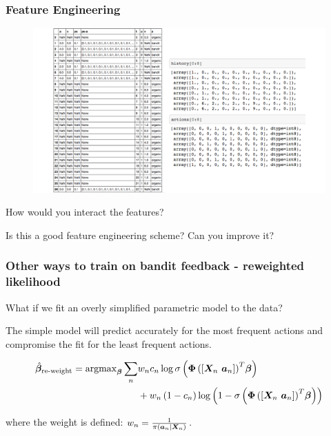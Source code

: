\begin{frame}
  \frametitle{Feature Engineering}
\begin{figure}[h!]
\includegraphics[scale=0.3]{images/feature_engineering.png}
\centering
\end{figure}

\pause
How would you interact the features?

\pause
Is this a good feature engineering scheme?  Can you improve it?
\end{frame}


\begin{frame}
  \frametitle{Other ways to train on bandit feedback - reweighted likelihood}

  What if we fit an overly simplified parametric model to the data?
  \pause

  The simple model will predict accurately for the most frequent actions and compromise the fit for the least frequent actions.


\begin{align*}
	\hat{\bm{\beta}}_{\operatorname{re-weight}} =  {\rm argmax}_{\bm{\beta}}
	\sum_n
	& w_n c_n \log \sigma
		\left(
			{\bm{\Phi}
				\left(
					\left[ {\bm{X}}_n ~ {\bm{a}}_n \right]
				\right)
			}^T \bm{\beta}
		\right)  \\
	& + w_n \left( 1-c_n \right)
		\log
			\left(
				1 - \sigma
					\left(
						{\bm{\Phi} \left(
								\left[ {\bm{X}}_n ~ {\bm{a}}_n \right]
							\right)
						}^T \bm{\beta}
					\right)
			\right)
\end{align*}

where the weight is defined: $w_n = \frac{1}{\pi\left( {\bm{a}}_n | {\bm{X}}_n \right)}$.

\end{frame}


